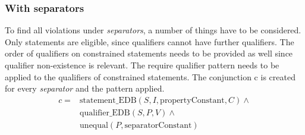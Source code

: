 \documentclass[hyperref,bachelorofscience,fleqn]{cgvpub}
\begin{document}
\subsubsection{With separators}\label{subsubsec_single_value_with_separators}
To find all violations under \emph{separators}, a number of things have to be considered. Only statements are eligible, since qualifiers cannot have further qualifiers. The order of qualifiers on constrained statements needs to be provided as well since qualifier non-existence is relevant. The require qualifier pattern needs to be applied to the qualifiers of constrained statements. The conjunction c is created for every \emph{separator} and the pattern applied.
\begin{equation*}
\begin{split}
c = &\text{statement\_EDB}(S, I, \text{propertyConstant}, C) \wedge{} \\
&\text{qualifier\_EDB}(S, P, V) \wedge{} \\
&\text{unequal}(P, \text{separatorConstant})
\end{split}
\end{equation*}
\end{document}
